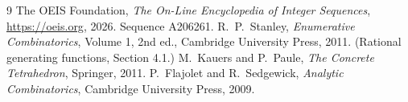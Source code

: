 \documentclass[11pt,a4paper]{article}
\theoremstyle{plain}
\theoremstyle{definition}
\begin{document}
\begin{thebibliography}{9}
 The OEIS Foundation, \emph{The On-Line Encyclopedia of Integer
Sequences}, \url{https://oeis.org}, 2026. Sequence A206261.
 R.~P.~Stanley, \emph{Enumerative Combinatorics}, Volume 1, 2nd ed.,
Cambridge University Press, 2011. (Rational generating functions, Section 4.1.)
 M.~Kauers and P.~Paule, \emph{The Concrete Tetrahedron}, Springer, 2011.
 P.~Flajolet and R.~Sedgewick, \emph{Analytic Combinatorics}, Cambridge
University Press, 2009.
\end{thebibliography}
\end{document}
